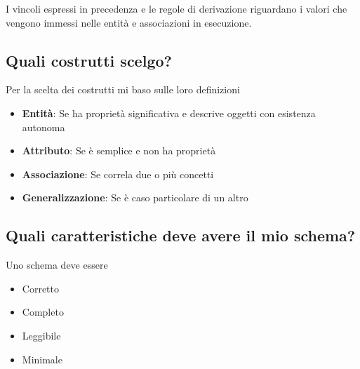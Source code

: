 \noindent I vincoli espressi in precedenza e le regole di derivazione riguardano i valori che vengono immessi nelle entità e associazioni in esecuzione.
\subsection{Quali costrutti scelgo?}
Per la scelta dei costrutti mi baso sulle loro definizioni
\begin{itemize}
	\item \textbf{Entità}: Se ha proprietà significativa e descrive oggetti con esistenza autonoma
	\item \textbf{Attributo}: Se è semplice e non ha proprietà
	\item \textbf{Associazione}: Se correla due o più concetti
	\item \textbf{Generalizzazione}: Se è caso particolare di un altro
\end{itemize}
\subsection{Quali caratteristiche deve avere il mio schema?}
Uno schema deve essere
\begin{multicols}{4}
	\begin{itemize}
		\item Corretto
		\item Completo 
		\item Leggibile
		\item Minimale 
	\end{itemize}
\end{multicols}
